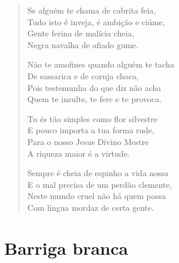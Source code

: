 \begin{verse}
Se alguém te chama de cabrita feia,\\
Tudo isto é inveja, é ambição e ciúme,\\
Gente ferina de malícia cheia,\\
Negra navalha de afiado gume.

Não te amofines quando alguém te tacha\\
De sassarica e de coruja choca,\\
Pois testemunha do que diz não acha\\
Quem te insulte, te fere e te provoca.

Tu és tão simples como flor silvestre\\
E pouco importa a tua forma rude,\\
Para o nosso Jesus Divino Mestre\\
A riqueza maior é a virtude.

Sempre é cheia de espinho a vida nossa\\
E o mal precisa de um perdão clemente,\\
Neste mundo cruel não há quem possa\\
Com língua mordaz de certa gente.
\end{verse}

\chapter{Barriga branca}

